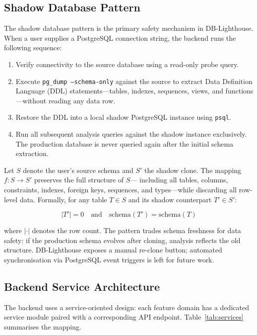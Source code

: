 \documentclass[conference]{IEEEtran}
\begin{document}
\subsection{Shadow Database Pattern}

The shadow database pattern is the primary safety mechanism in
DB-Lighthouse. When a user supplies a PostgreSQL connection string, the
backend runs the following sequence:

\begin{enumerate}
    \item Verify connectivity to the source database using a read-only
    probe query.
    \item Execute \texttt{pg\_dump --schema-only} against the source to
    extract Data Definition Language (DDL) statements---tables, indexes,
    sequences, views, and functions---without reading any data row.
    \item Restore the DDL into a local shadow PostgreSQL instance using
    \texttt{psql}.
    \item Run all subsequent analysis queries against the shadow
    instance exclusively. The production database is never queried again
    after the initial schema extraction.
\end{enumerate}

Let $S$ denote the user's source schema and $S'$ the shadow clone. The
mapping $f: S \rightarrow S'$ preserves the full structure of $S$---
including all tables, columns, constraints, indexes, foreign keys,
sequences, and types---while discarding all row-level data. Formally,
for any table $T \in S$ and its shadow counterpart $T' \in S'$:

\begin{equation}
    |T'| = 0 \quad \text{and} \quad \text{schema}(T') = \text{schema}(T)
\end{equation}

where $|\cdot|$ denotes the row count. The pattern trades schema freshness
for data safety: if the production schema evolves after cloning, analysis
reflects the old structure. DB-Lighthouse exposes a manual re-clone button;
automated synchronisation via PostgreSQL event triggers is left for future
work.

\subsection{Backend Service Architecture}

The backend uses a service-oriented design: each feature domain has a
dedicated service module paired with a corresponding API endpoint.
Table~\ref{tab:services} summarises the mapping.
\end{document}
